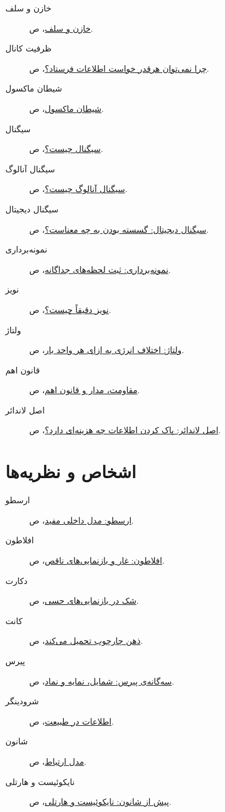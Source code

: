 \begin{description}
  \item[خازن و سلف] \hyperref[sub:capacitors-and-inductors]{خازن و سلف}، ص.\ \pageref{sub:capacitors-and-inductors}
  \item[ظرفیت کانال] \hyperref[sub:channel-capacity]{چرا نمی‌توان هرقدر خواست اطلاعات فرستاد؟}، ص.\ \pageref{sub:channel-capacity}
  \item[شیطان ماکسول] \hyperref[sub:maxwells-demon]{شیطان ماکسول}، ص.\ \pageref{sub:maxwells-demon}
  \item[سیگنال] \hyperref[sub:what-is-signal]{سیگنال چیست؟}، ص.\ \pageref{sub:what-is-signal}
  \item[سیگنال آنالوگ] \hyperref[sub:analog-signal]{سیگنال آنالوگ چیست؟}، ص.\ \pageref{sub:analog-signal}
  \item[سیگنال دیجیتال] \hyperref[sub:digital-signal]{سیگنال دیجیتال: گسسته بودن به چه معناست؟}، ص.\ \pageref{sub:digital-signal}
  \item[نمونه‌برداری] \hyperref[sub:sampling]{نمونه‌برداری: ثبت لحظه‌های جداگانه}، ص.\ \pageref{sub:sampling}
  \item[نویز] \hyperref[sub:what-is-noise]{نویز دقیقاً چیست؟}، ص.\ \pageref{sub:what-is-noise}
  \item[ولتاژ] \hyperref[sub:voltage]{ولتاژ: اختلاف انرژی به ازای هر واحد بار}، ص.\ \pageref{sub:voltage}
  \item[قانون اهم] \hyperref[sub:resistance-circuit-ohms-law]{مقاومت، مدار و قانون اهم}، ص.\ \pageref{sub:resistance-circuit-ohms-law}
  \item[اصل لاندائر] \hyperref[sub:landauer-principle]{اصل لاندائر: پاک کردن اطلاعات چه هزینه‌ای دارد؟}، ص.\ \pageref{sub:landauer-principle}
\end{description}

\section*{اشخاص و نظریه‌ها}
\begin{description}
  \item[ارسطو] \hyperref[sub:aristotle-model]{ارسطو: مدل داخلی مفید}، ص.\ \pageref{sub:aristotle-model}
  \item[افلاطون] \hyperref[sub:plato-cave]{افلاطون: غار و بازنمایی‌های ناقص}، ص.\ \pageref{sub:plato-cave}
  \item[دکارت] \hyperref[sub:descartes-doubt]{شک در بازنمایی‌های حسی}، ص.\ \pageref{sub:descartes-doubt}
  \item[کانت] \hyperref[sub:kant-framework]{ذهن چارچوب تحمیل می‌کند}، ص.\ \pageref{sub:kant-framework}
  \item[پیرس] \hyperref[sub:peirce-triad]{سه‌گانه‌ی پیرس: شمایل، نمایه و نماد}، ص.\ \pageref{sub:peirce-triad}
  \item[شرودینگر] \hyperref[sec:information-in-nature]{اطلاعات در طبیعت}، ص.\ \pageref{sec:information-in-nature}
  \item[شانون] \hyperref[sub:communication-model]{مدل ارتباط}، ص.\ \pageref{sub:communication-model}
  \item[نایکوئیست و هارتلی] \hyperref[sub:nyquist-and-hartley]{پیش از شانون: نایکوئیست و هارتلی}، ص.\ \pageref{sub:nyquist-and-hartley}
\end{description}
